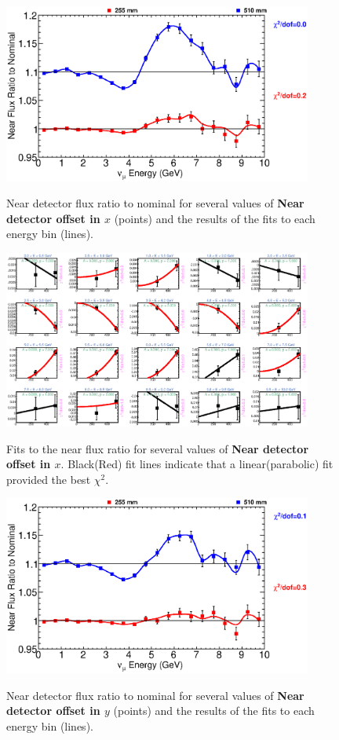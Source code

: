 \begin{figure}[ht]
  \begin{center}
    {\includegraphics[width=4.0in]{figures/LBNENDX_near_summary.eps}}
  \end{center}
\caption{ Near detector flux ratio to nominal for several values of {\bf Near detector offset in $x$} (points) and the results of the fits to each energy bin (lines).}
\end{figure}

\begin{figure}[hb]
  \begin{center}
    {\includegraphics[width=4.0in]{figures/LBNENDX_near_fits.eps}}
  \end{center}
\caption{ Fits to the near flux ratio for several values of {\bf Near detector offset in $x$}. Black(Red) fit lines indicate that a linear(parabolic) fit provided the best $\chi^2$. }
\end{figure}

\begin{figure}[ht]
  \begin{center}
    {\includegraphics[width=4.0in]{figures/LBNENDY_near_summary.eps}}
  \end{center}
\caption{ Near detector flux ratio to nominal for several values of {\bf Near detector offset in $y$} (points) and the results of the fits to each energy bin (lines).}
\end{figure}

